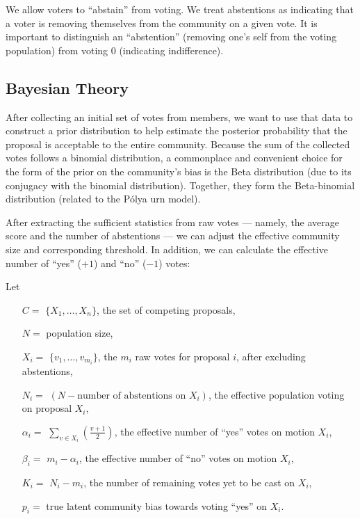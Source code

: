 \documentclass[chi_draft]{sigchi}
\begin{document}
We allow voters to ``abstain'' from voting.
We treat abstentions as indicating that a voter is removing themselves from the community on a given vote.
It is important to distinguish an ``abstention'' (removing one's self from the voting population) from voting $0$ (indicating indifference).

\subsection{Bayesian Theory}


After collecting an initial set of votes from members, we want to use that data to construct a prior distribution to help estimate the posterior probability that the proposal is acceptable to the entire community.  Because the sum of  the collected votes follows a binomial distribution, a commonplace and convenient choice for the form of the prior on the community's bias is the Beta distribution (due to its conjugacy with the binomial distribution).  Together, they form the Beta-binomial distribution (related to the P\'olya urn model).

After extracting the sufficient statistics from raw votes --- namely, the average score and the number of abstentions --- we can adjust the effective community size and corresponding threshold.  In addition, we can calculate the effective number of ``yes'' ($+1$) and ``no'' ($-1$) votes:

Let
\begin{description}
\begin{itemize}
\item[$C = $] $\{X_1,\ldots, X_n\}$, the set of competing proposals,
\item[$N = $] population size,
\item[$X_i = $] $\{v_1, \ldots, v_{m_i}\}$, the $m_i$ raw votes for proposal $i$, after excluding abstentions,
\item[$N_i = $] $(N - \textrm{number of abstentions on } X_i)$, the effective population voting on proposal $X_i$,
\item[$\alpha_i = $] $\sum\limits_{v \in X_i}\left(\frac{v+1}{2}\right)$, the effective number of ``yes'' votes on motion $X_i$,
\item[$\beta_i = $] $m_i - \alpha_i$, the effective number of ``no'' votes on motion $X_i$,
\item[$K_i = $] $N_i - m_i$, the number of remaining votes yet to be cast on $X_i$,
\item[$p_i = $] true latent community bias towards voting ``yes'' on $X_i$.
\end{itemize}
\end{description}
\end{document}
